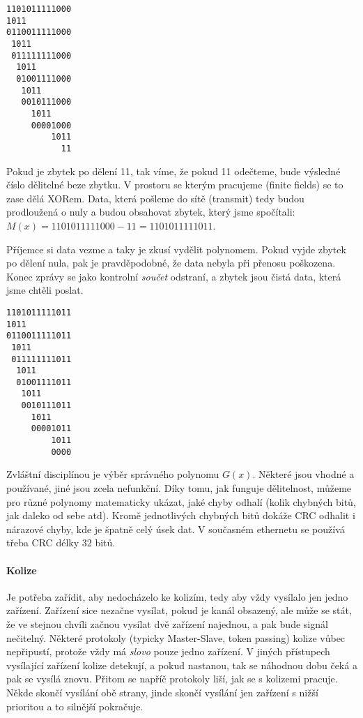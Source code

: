 \begin{lstlisting}
1101011111000
1011
0110011111000
 1011
 011111111000
  1011
  01001111000
   1011
   0010111000
     1011
     00001000
         1011
           11
\end{lstlisting}

Pokud je zbytek po dělení 11, tak víme, že pokud 11 odečteme, bude výsledné číslo dělitelné beze zbytku. V prostoru se kterým pracujeme (finite fields) se to zase dělá XORem. Data, která pošleme do sítě (transmit) tedy budou prodloužená o nuly a budou obsahovat zbytek, který jsme spočítali: $M(x) = 1101011111000 - 11 = 1101011111011$.

Příjemce si data vezme a taky je zkusí vydělit polynomem. Pokud vyjde zbytek po dělení nula, pak je pravděpodobné, že data nebyla při přenosu poškozena. Konec zprávy se jako kontrolní \textit{součet} odstraní, a zbytek jsou čistá data, která jsme chtěli poslat.
\begin{lstlisting}
1101011111011
1011
0110011111011
 1011
 011111111011
  1011
  01001111011
   1011
   0010111011
     1011
     00001011
         1011
         0000
\end{lstlisting}

Zvláštní disciplínou je výběr správného polynomu $G(x)$. Některé jsou vhodné a používané, jiné jsou zcela nefunkční. Díky tomu, jak funguje dělitelnost, můžeme pro různé polynomy matematicky ukázat, jaké chyby odhalí (kolik chybných bitů, jak daleko od sebe atd). Kromě jednotlivých chybných bitů dokáže CRC odhalit i nárazové chyby, kde je špatně celý úsek dat. V současném ethernetu se používá třeba CRC délky 32 bitů.

\paragraph{Kolize} Je potřeba zařídit, aby nedocházelo ke kolizím, tedy aby vždy vysílalo jen jedno zařízení. Zařízení sice nezačne vysílat, pokud je kanál obsazený, ale může se stát, že ve stejnou chvíli začnou vysílat dvě zařízení najednou, a pak bude signál nečitelný. Některé protokoly (typicky Master-Slave, token passing) kolize vůbec nepřipustí, protože vždy má \textit{slovo} pouze jedno zařízení. V jiných přístupech vysílající zařízení kolize detekují, a pokud nastanou, tak se náhodnou dobu čeká a pak se vysílá znovu. Přitom se napříč protokoly liší, jak se s kolizemi pracuje. Někde skončí vysílání obě strany, jinde skončí vysílání jen zařízení s nižší prioritou a to silnější pokračuje.

